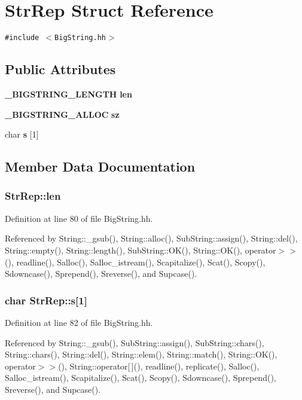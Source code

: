 \section{Str\-Rep  Struct Reference}
\label{structStrRep}
{\tt \#include $<$Big\-String.hh$>$}

\subsection*{Public Attributes}
\begin{CompactItemize}
\item 
{\bf \_\-BIGSTRING\_\-LENGTH} {\bf len}
\item 
{\bf \_\-BIGSTRING\_\-ALLOC} {\bf sz}
\item 
char {\bf s} [1]
\end{CompactItemize}


\subsection{Member Data Documentation}
\subsubsection{ Str\-Rep::len}\label{structStrRep_m0}




Definition at line 80 of file Big\-String.hh.

Referenced by String::\_\-gsub(), String::alloc(), Sub\-String::assign(), String::del(), String::empty(), String::length(), Sub\-String::OK(), String::OK(), operator$>$$>$(), readline(), Salloc(), Salloc\_\-istream(), Scapitalize(), Scat(), Scopy(), Sdowncase(), Sprepend(), Sreverse(), and Supcase().
\subsubsection{\setlength{\rightskip}{0pt plus 5cm}char Str\-Rep::s[1]}\label{structStrRep_m2}




Definition at line 82 of file Big\-String.hh.

Referenced by String::\_\-gsub(), Sub\-String::assign(), Sub\-String::chars(), String::chars(), String::del(), String::elem(), String::match(), String::OK(), operator$>$$>$(), String::operator[$\,$](), readline(), replicate(), Salloc(), Salloc\_\-istream(), Scapitalize(), Scat(), Scopy(), Sdowncase(), Sprepend(), Sreverse(), and Supcase().
